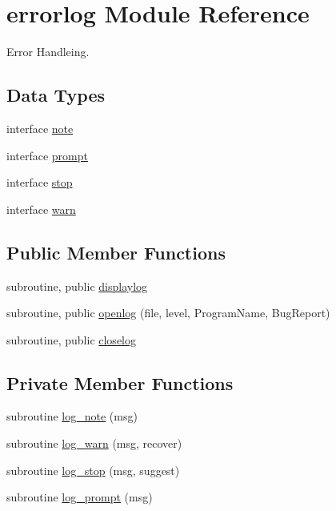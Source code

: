 \hypertarget{classerrorlog}{\section{errorlog Module Reference}
\label{classerrorlog}
}


Error Handleing.  


\subsection*{Data Types}
\begin{DoxyCompactItemize}
\item 
interface \hyperlink{interfaceerrorlog_1_1note}{note}
\item 
interface \hyperlink{interfaceerrorlog_1_1prompt}{prompt}
\item 
interface \hyperlink{interfaceerrorlog_1_1stop}{stop}
\item 
interface \hyperlink{interfaceerrorlog_1_1warn}{warn}
\end{DoxyCompactItemize}
\subsection*{Public Member Functions}
\begin{DoxyCompactItemize}
\item 
subroutine, public \hyperlink{classerrorlog_a05d233f410ba88bf3e2929528b1bb91e}{displaylog}
\item 
subroutine, public \hyperlink{classerrorlog_a32bbf87dd265de25bd10ea31d95b751d}{openlog} (file, level, Program\-Name, Bug\-Report)
\item 
subroutine, public \hyperlink{classerrorlog_af9219c790b58905faca7f5695515325d}{closelog}
\end{DoxyCompactItemize}
\subsection*{Private Member Functions}
\begin{DoxyCompactItemize}
\item 
subroutine \hyperlink{classerrorlog_abcaf87ab55e0634007cc7177aa53469c}{log\-\_\-note} (msg)
\item 
subroutine \hyperlink{classerrorlog_ac0a3d2c2bcdb3af8e91b4a27d2ac5ac0}{log\-\_\-warn} (msg, recover)
\item 
subroutine \hyperlink{classerrorlog_afe1872ea4ca114ccb25faaa2f2d60e2e}{log\-\_\-stop} (msg, suggest)
\item 
subroutine \hyperlink{classerrorlog_ac6531d63b5a5d4939c3d510dd7fbbb25}{log\-\_\-prompt} (msg)
\end{DoxyCompactItemize}
